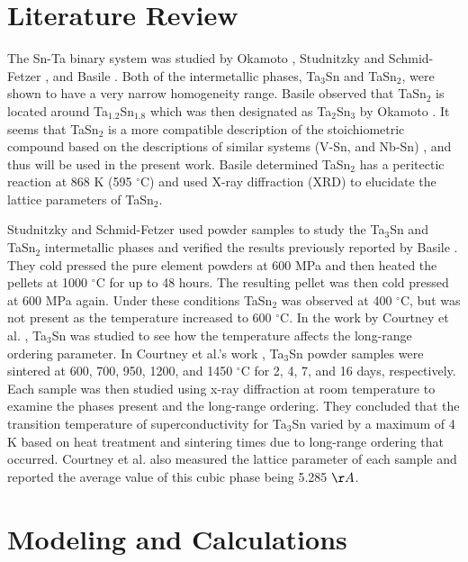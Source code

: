 \section{Literature Review}

The Sn-Ta binary system was studied by Okamoto \cite{Okamoto2003}, Studnitzky and Schmid-Fetzer \cite{Studnitzky2002}, and Basile \cite{Basile1971}. Both of the intermetallic phases, Ta$_{3}$Sn and TaSn$_{2}$, were shown to have a very narrow homogeneity range. Basile \cite{Basile1971} observed that TaSn$_{2}$ is located around Ta$_{1.2}$Sn$_{1.8}$ which was then designated as Ta$_2$Sn$_3$ by Okamoto \cite{Okamoto2003}. It seems that TaSn$_2$ is a more compatible description of the stoichiometric compound based on the descriptions of similar systems (V-Sn, and Nb-Sn) \cite{Yue2009,Toffolon1998,Toffolon2002}, and thus will be used in the present work. Basile \cite{Basile1971} determined TaSn$_2$ has a peritectic reaction at 868 K (595 $^{\circ}$C) and used X-ray diffraction (XRD) to elucidate the lattice parameters of TaSn$_2$.  

Studnitzky and Schmid-Fetzer \cite{Studnitzky2002} used powder samples to study the Ta$_3$Sn and TaSn$_2$ intermetallic phases and verified the results previously reported by Basile \cite{Basile1971}. They cold pressed the pure element powders at 600 MPa and then heated the pellets at 1000 $^{\circ}$C for up to 48 hours.  The resulting pellet was then cold pressed at 600 MPa again. Under these conditions TaSn$_2$ was observed at 400 $^{\circ}$C, but was not present as the temperature increased to 600 $^{\circ}$C.  In the work by Courtney et al. \cite{Courtney1965}, Ta$_3$Sn was studied to see how the temperature affects the long-range ordering parameter. In Courtney et al.'s work  \cite{Courtney1965}, Ta$_3$Sn powder samples were sintered at 600, 700, 950, 1200, and 1450 $^{\circ}$C for 2, 4, 7, and 16 days, respectively.  Each sample was then studied using x-ray diffraction at room temperature to examine the phases present and the long-range ordering. They concluded that the transition temperature of superconductivity for Ta$_3$Sn varied by a maximum of 4 K based on heat treatment and sintering times due to long-range ordering that occurred. Courtney et al.  \cite{Courtney1965} also measured the lattice parameter of each sample and reported the average value of this cubic phase being 5.285 $\AA$.


\section{Modeling and Calculations}

